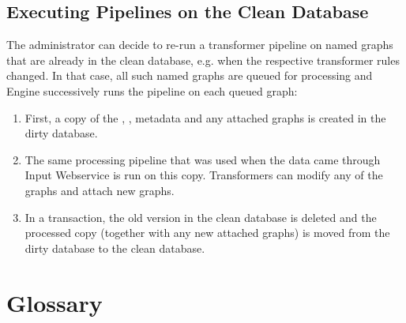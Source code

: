 \section{Executing Pipelines on the Clean Database}
\label{sec:pipelinesOnCleanDB}

The administrator  can decide to re-run a transformer pipeline on named graphs that are already in the clean database, e.g. when the respective transformer rules changed. In that case, all such named graphs are queued for processing and Engine successively runs the pipeline on each queued graph:

\begin{enumerate}
  \item First, a copy of the , , metadata and any attached graphs is created in the dirty database.
  \item The same processing pipeline that was used when the data came through Input Webservice is run on this copy. Transformers can modify any of the graphs and attach new graphs.
  \item In a transaction, the old version in the clean database is deleted and the processed copy (together with any new attached graphs) is moved from the dirty database to the clean database.
\end{enumerate}

\appendix

\chapter{Glossary}

